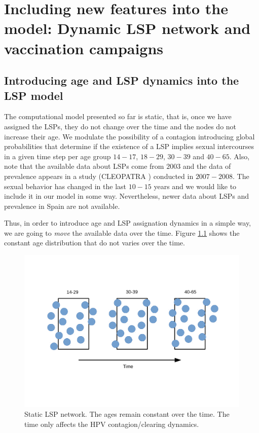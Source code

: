 \chapter{Including new features into the model: Dynamic LSP network and vaccination campaigns}\label{DinamicaYVacunacion}
\section{Introducing age and LSP dynamics into the LSP model}
The computational model presented so far is static, that is, once we have assigned the LSPs, they do not change over the time and the nodes do not increase their age. We modulate the possibility of a contagion introducing global probabilities that determine if the existence of a LSP implies sexual intercourses in a given time step per age group $14-17$, $18-29$, $30-39$ and $40-65$. Also, note that the available data about LSPs come from $2003$ and the data of prevalence appears in a study (CLEOPATRA \cite{castellsague2012prevalence}) conducted in $2007-2008$. The sexual behavior has changed in the last $10-15$ years and we would like to include it in our model in some way. Nevertheless, newer data about LSPs and prevalence in Spain are not available.

Thus, in order to introduce age and LSP assignation dynamics in a simple way, we are going to \textit{move} the available data over the time. Figure \ref{fig:dinam1} shows the constant age distribution that do not varies over the time.

\begin{figure}[h!]
	\centering
	\includegraphics[width=0.7\linewidth]{IMGs/2.-New_features/Dinam_1.pdf}
	\caption{Static LSP network. The ages remain constant over the time. The time only affects the HPV contagion/clearing dynamics.}
	\label{fig:dinam1}
\end{figure}

